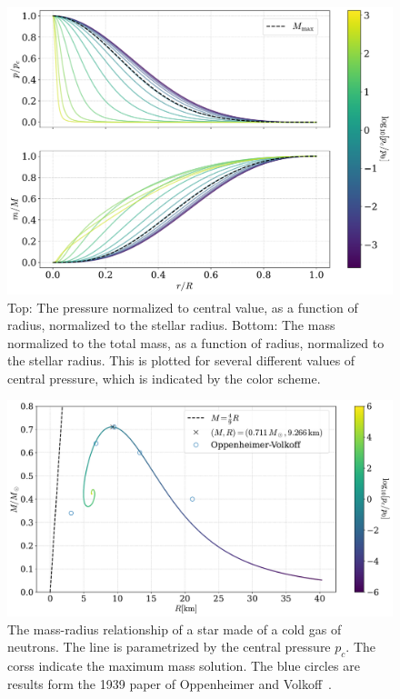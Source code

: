 \begin{figure}[p]
    \centering
    \includegraphics[width=\textwidth]{../scripts/figurer/pressure_mass.pdf}
    \caption{
        Top: The pressure normalized to central value, as a function of radius, normalized to the stellar radius.
        Bottom: The mass normalized to the total mass, as a function of radius, normalized to the stellar radius. 
        This is plotted for several different values of central pressure, which is indicated by the color scheme.
        }
    \label{fig: pressure and mass as a function of radius}
\end{figure}


\begin{figure}[p]
    \centering
    \includegraphics[width=\textwidth]{../scripts/figurer/mass_radius_neutron.pdf}
    \caption{The mass-radius relationship of a star made of a cold gas of neutrons. The line is parametrized by the central pressure $p_c$. The corss indicate the maximum mass solution. The blue circles are results form the 1939 paper of Oppenheimer and Volkoff~\autocite{oppenheimerMassiveNeutronCores1939}.}
    \label{fig: mass radius relationship fermi gas}
\end{figure}

